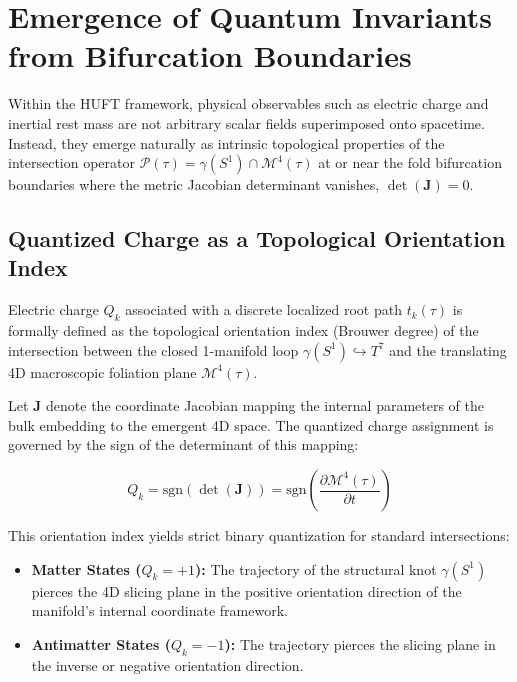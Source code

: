
\section{Emergence of Quantum Invariants from Bifurcation Boundaries}
\label{sec:quantum_emergence}

Within the HUFT framework, physical observables such as electric charge and inertial rest mass are not arbitrary scalar fields superimposed onto spacetime. Instead, they emerge naturally as intrinsic topological properties of the intersection operator $\mathcal{P}(\tau) = \gamma(S^1) \cap \mathcal{M}^4(\tau)$ at or near the fold bifurcation boundaries where the metric Jacobian determinant vanishes, $\det(\mathbf{J}) = 0$.

\subsection{Quantized Charge as a Topological Orientation Index}
\label{subsec:charge_index}

Electric charge $Q_k$ associated with a discrete localized root path $t_k(\tau)$ is formally defined as the topological orientation index (Brouwer degree) of the intersection between the closed 1-manifold loop $\gamma(S^1) \hookrightarrow T^7$ and the translating 4D macroscopic foliation plane $\mathcal{M}^4(\tau)$. 

Let $\mathbf{J}$ denote the coordinate Jacobian mapping the internal parameters of the bulk embedding to the emergent 4D space. The quantized charge assignment is governed by the sign of the determinant of this mapping:

\begin{equation}
    Q_k = \text{sgn}\left( \det(\mathbf{J}) \right) = \text{sgn}\left( \frac{\partial \mathcal{M}^4(\tau)}{\partial t} \right)
\end{equation}

This orientation index yields strict binary quantization for standard intersections:
\begin{itemize}
    \item \textbf{Matter States ($Q_k = +1$):} The trajectory of the structural knot $\gamma(S^1)$ pierces the 4D slicing plane in the positive orientation direction of the manifold's internal coordinate framework.
    \item \textbf{Antimatter States ($Q_k = -1$):} The trajectory pierces the slicing plane in the inverse or negative orientation direction.
\end{itemize}


